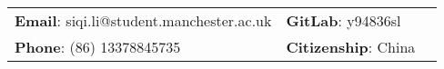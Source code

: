 \documentclass[letterpaper, 11pt]{article}
\begin{document}


\vspace{0.5cm} 
\begin{center}
\begin{tabular}{lll}
\textbf{Email}: siqi.li@student.manchester.ac.uk      &
\hspace{0.55in} \textbf{GitLab}: y94836sl \\

\textbf{Phone}: (86) 13378845735    & 
\hspace{0.55in}  \textbf{Citizenship}: China 
\end{tabular}
\end{center}


\setlength{\tabcolsep}{8pt}
\end{document}
